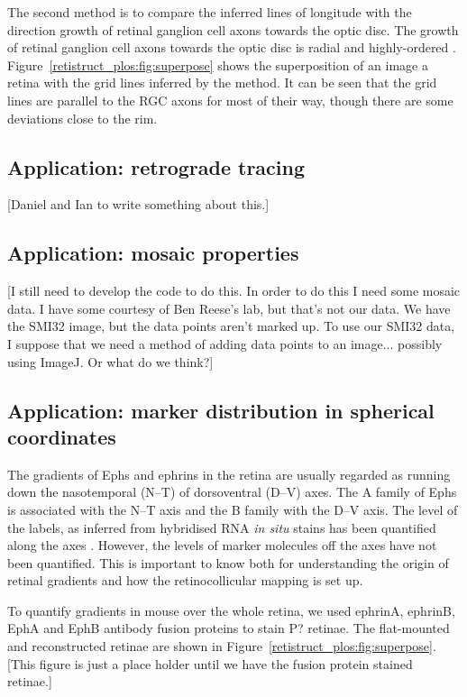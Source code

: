 \documentclass[10pt]{article}
\newcommand{\todo}[1]{{\color{red}[#1]}}
\begin{document}
The second method is to compare the inferred lines of longitude with
the direction growth of retinal ganglion cell axons towards the optic
disc.  The growth of retinal ganglion cell axons towards the optic
disc is radial and highly-ordered
\cite{ErskThom09intr}. Figure~\ref{retistruct_plos:fig:superpose}
shows the superposition of an image a retina \cite{KeelEtal11neur}
with the grid lines inferred by the method. It can be seen that the
grid lines are parallel to the RGC axons for most of their way, though
there are some deviations close to the rim.

\subsection*{Application: retrograde tracing}

\todo{Daniel and Ian to write something about this.}

\subsection*{Application: mosaic properties}

\todo{I still need to develop the code to do this. In order to do this
  I need some mosaic data. I have some courtesy of Ben Reese's lab,
  but that's not our data. We have the SMI32 image, but the data points
  aren't marked up. To use our SMI32 data, I suppose that we need a
  method of adding data points to an image... possibly using ImageJ.
  Or what do we think?}

\subsection*{Application: marker distribution in spherical coordinates}

The gradients of Ephs and ephrins in the retina are usually regarded
as running down the nasotemporal (N--T) of dorsoventral (D--V)
axes. The A family of Ephs is associated with the N--T axis and the B
family with the D--V axis. The level of the labels, as inferred from
hybridised RNA \emph{in situ} stains has been quantified along the
axes \cite{ChenEtal95comp,RebeEtal04rela}.  However, the levels of
marker molecules off the axes have not been quantified. This is
important to know both for understanding the origin of retinal
gradients and how the retinocollicular mapping is set up. 

To quantify gradients in mouse over the whole retina, we used ephrinA,
ephrinB, EphA and EphB antibody fusion proteins to stain P?
retinae. The flat-mounted and reconstructed retinae are shown in
Figure~\ref{retistruct_plos:fig:superpose}.
\todo{This figure is just a place holder until we have the fusion
  protein stained retinae.}
\end{document}
